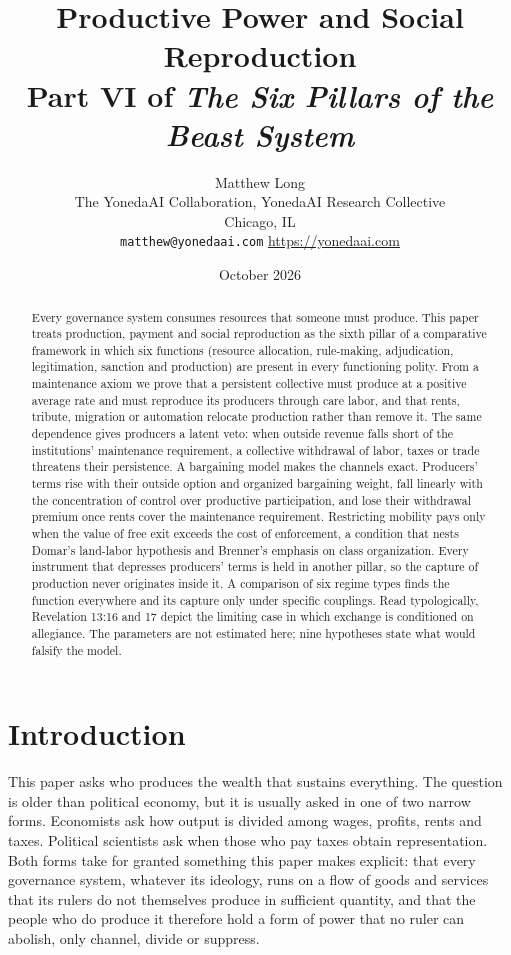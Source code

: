 \documentclass[11pt,letterpaper]{article}
\title{Productive Power and Social Reproduction\\[4pt]
  {\normalsize Part VI of \emph{The Six Pillars of the Beast System}}}
\author{Matthew Long\\
  \small The YonedaAI Collaboration, YonedaAI Research Collective\\
  \small Chicago, IL\\
  \small \texttt{matthew@yonedaai.com} \quad \url{https://yonedaai.com}}
\date{October 2026}
\theoremstyle{definition}
\theoremstyle{remark}
\begin{document}
\maketitle

\begin{abstract}
Every governance system consumes resources that someone must produce. This paper treats production, payment and social reproduction as the sixth pillar of a comparative framework in which six functions (resource allocation, rule-making, adjudication, legitimation, sanction and production) are present in every functioning polity. From a maintenance axiom we prove that a persistent collective must produce at a positive average rate and must reproduce its producers through care labor, and that rents, tribute, migration or automation relocate production rather than remove it. The same dependence gives producers a latent veto: when outside revenue falls short of the institutions' maintenance requirement, a collective withdrawal of labor, taxes or trade threatens their persistence. A bargaining model makes the channels exact. Producers' terms rise with their outside option and organized bargaining weight, fall linearly with the concentration of control over productive participation, and lose their withdrawal premium once rents cover the maintenance requirement. Restricting mobility pays only when the value of free exit exceeds the cost of enforcement, a condition that nests Domar's land-labor hypothesis and Brenner's emphasis on class organization. Every instrument that depresses producers' terms is held in another pillar, so the capture of production never originates inside it. A comparison of six regime types finds the function everywhere and its capture only under specific couplings. Read typologically, Revelation 13:16 and 17 depict the limiting case in which exchange is conditioned on allegiance. The parameters are not estimated here; nine hypotheses state what would falsify the model.
\end{abstract}

\section{Introduction}
\label{sec:intro}

This paper asks who produces the wealth that sustains everything. The question is older than political economy, but it is usually asked in one of two narrow forms. Economists ask how output is divided among wages, profits, rents and taxes. Political scientists ask when those who pay taxes obtain representation. Both forms take for granted something this paper makes explicit: that every governance system, whatever its ideology, runs on a flow of goods and services that its rulers do not themselves produce in sufficient quantity, and that the people who do produce it therefore hold a form of power that no ruler can abolish, only channel, divide or suppress.
\end{document}
